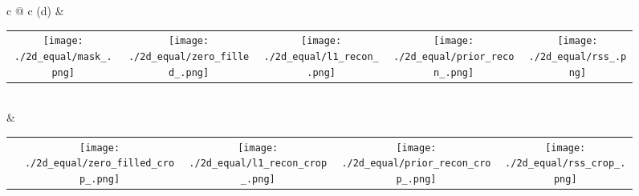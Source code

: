 \documentclass[a4paper, 12pt]{article}
\begin{document}
\begin{figure}
\begin{tabular}{c @{\hskip 1pt} c}
            (d) &\begin{tabular}{c @{\hskip 1pt} c @{\hskip 1pt} c @{\hskip 1pt} c @{\hskip 1pt} c}
                \texttt{[image: ./2d\_equal/mask\_.png]}&
                \texttt{[image: ./2d\_equal/zero\_filled\_.png]}&
                \texttt{[image: ./2d\_equal/l1\_recon\_.png]}&
                \texttt{[image: ./2d\_equal/prior\_recon\_.png]}&
                \texttt{[image: ./2d\_equal/rss\_.png]} 
                \end{tabular}\\
            \phantom{(a)} & \begin{tabular}{c @{\hskip 1pt} c @{\hskip 1pt} c @{\hskip 1pt} c @{\hskip 1pt} c}
                \phantom{\texttt{[image: ./1d\_random/zero\_filled\_crop\_.png]}}&
                \texttt{[image: ./2d\_equal/zero\_filled\_crop\_.png]}&
                \texttt{[image: ./2d\_equal/l1\_recon\_crop\_.png]}&
                \texttt{[image: ./2d\_equal/prior\_recon\_crop\_.png]}&
                \texttt{[image: ./2d\_equal/rss\_crop\_.png]}
                \end{tabular}\\
        \end{tabular}
    \end{figure}
\end{document}
